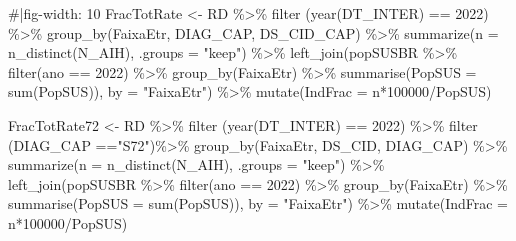 \documentclass[
  letterpaper,
  DIV=11,
  numbers=noendperiod]{scrartcl}
\newenvironment{Shaded}{\begin{snugshade}}{\end{snugshade}}
\newcommand{\AttributeTok}[1]{\textcolor[rgb]{0.40,0.45,0.13}{#1}}
\newcommand{\CommentTok}[1]{\textcolor[rgb]{0.37,0.37,0.37}{#1}}
\newcommand{\DecValTok}[1]{\textcolor[rgb]{0.68,0.00,0.00}{#1}}
\newcommand{\FunctionTok}[1]{\textcolor[rgb]{0.28,0.35,0.67}{#1}}
\newcommand{\NormalTok}[1]{\textcolor[rgb]{0.00,0.23,0.31}{#1}}
\newcommand{\OtherTok}[1]{\textcolor[rgb]{0.00,0.23,0.31}{#1}}
\newcommand{\SpecialCharTok}[1]{\textcolor[rgb]{0.37,0.37,0.37}{#1}}
\newcommand{\StringTok}[1]{\textcolor[rgb]{0.13,0.47,0.30}{#1}}
\begin{document}
\begin{Shaded}
\begin{Highlighting}[]
\CommentTok{\#|fig{-}width: 10}
\NormalTok{FracTotRate }\OtherTok{\textless{}{-}}\NormalTok{ RD }\SpecialCharTok{\%\textgreater{}\%} \FunctionTok{filter}\NormalTok{ (}\FunctionTok{year}\NormalTok{(DT\_INTER) }\SpecialCharTok{==} \DecValTok{2022}\NormalTok{) }\SpecialCharTok{\%\textgreater{}\%} 
  \FunctionTok{group\_by}\NormalTok{(FaixaEtr, DIAG\_CAP, DS\_CID\_CAP) }\SpecialCharTok{\%\textgreater{}\%}
  \FunctionTok{summarize}\NormalTok{(}\AttributeTok{n =} \FunctionTok{n\_distinct}\NormalTok{(N\_AIH), }\AttributeTok{.groups =} \StringTok{"keep"}\NormalTok{) }\SpecialCharTok{\%\textgreater{}\%} 
  \FunctionTok{left\_join}\NormalTok{(popSUSBR }\SpecialCharTok{\%\textgreater{}\%} \FunctionTok{filter}\NormalTok{(ano }\SpecialCharTok{==} \DecValTok{2022}\NormalTok{) }\SpecialCharTok{\%\textgreater{}\%} \FunctionTok{group\_by}\NormalTok{(FaixaEtr) }\SpecialCharTok{\%\textgreater{}\%} \FunctionTok{summarise}\NormalTok{(}\AttributeTok{PopSUS =} \FunctionTok{sum}\NormalTok{(PopSUS)), }\AttributeTok{by =} \StringTok{"FaixaEtr"}\NormalTok{) }\SpecialCharTok{\%\textgreater{}\%}
  \FunctionTok{mutate}\NormalTok{(}\AttributeTok{IndFrac =}\NormalTok{ n}\SpecialCharTok{*}\DecValTok{100000}\SpecialCharTok{/}\NormalTok{PopSUS)}

\NormalTok{FracTotRate72 }\OtherTok{\textless{}{-}}\NormalTok{ RD }\SpecialCharTok{\%\textgreater{}\%} \FunctionTok{filter}\NormalTok{ (}\FunctionTok{year}\NormalTok{(DT\_INTER) }\SpecialCharTok{==} \DecValTok{2022}\NormalTok{) }\SpecialCharTok{\%\textgreater{}\%}  \FunctionTok{filter}\NormalTok{ (DIAG\_CAP }\SpecialCharTok{==}\StringTok{"S72"}\NormalTok{)}\SpecialCharTok{\%\textgreater{}\%}
  \FunctionTok{group\_by}\NormalTok{(FaixaEtr, DS\_CID, DIAG\_CAP) }\SpecialCharTok{\%\textgreater{}\%} \FunctionTok{summarize}\NormalTok{(}\AttributeTok{n =} \FunctionTok{n\_distinct}\NormalTok{(N\_AIH), }\AttributeTok{.groups =} \StringTok{"keep"}\NormalTok{) }\SpecialCharTok{\%\textgreater{}\%} 
  \FunctionTok{left\_join}\NormalTok{(popSUSBR }\SpecialCharTok{\%\textgreater{}\%} \FunctionTok{filter}\NormalTok{(ano }\SpecialCharTok{==} \DecValTok{2022}\NormalTok{) }\SpecialCharTok{\%\textgreater{}\%} \FunctionTok{group\_by}\NormalTok{(FaixaEtr) }\SpecialCharTok{\%\textgreater{}\%} \FunctionTok{summarise}\NormalTok{(}\AttributeTok{PopSUS =} \FunctionTok{sum}\NormalTok{(PopSUS)), }\AttributeTok{by =} \StringTok{"FaixaEtr"}\NormalTok{) }\SpecialCharTok{\%\textgreater{}\%}
  \FunctionTok{mutate}\NormalTok{(}\AttributeTok{IndFrac =}\NormalTok{ n}\SpecialCharTok{*}\DecValTok{100000}\SpecialCharTok{/}\NormalTok{PopSUS)}


\end{Highlighting}
\end{Shaded}
\end{document}
